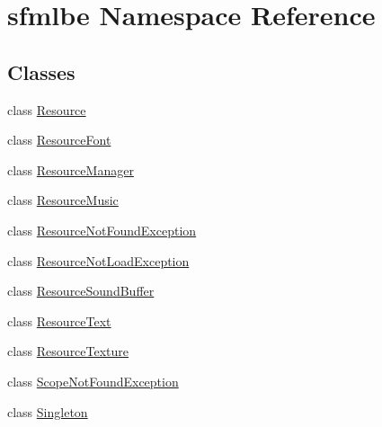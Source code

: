 \hypertarget{namespacesfmlbe}{}\section{sfmlbe Namespace Reference}
\label{namespacesfmlbe}
\subsection*{Classes}
\begin{DoxyCompactItemize}
\item 
class \mbox{\hyperlink{classsfmlbe_1_1_resource}{Resource}}
\item 
class \mbox{\hyperlink{classsfmlbe_1_1_resource_font}{Resource\+Font}}
\item 
class \mbox{\hyperlink{classsfmlbe_1_1_resource_manager}{Resource\+Manager}}
\item 
class \mbox{\hyperlink{classsfmlbe_1_1_resource_music}{Resource\+Music}}
\item 
class \mbox{\hyperlink{classsfmlbe_1_1_resource_not_found_exception}{Resource\+Not\+Found\+Exception}}
\item 
class \mbox{\hyperlink{classsfmlbe_1_1_resource_not_load_exception}{Resource\+Not\+Load\+Exception}}
\item 
class \mbox{\hyperlink{classsfmlbe_1_1_resource_sound_buffer}{Resource\+Sound\+Buffer}}
\item 
class \mbox{\hyperlink{classsfmlbe_1_1_resource_text}{Resource\+Text}}
\item 
class \mbox{\hyperlink{classsfmlbe_1_1_resource_texture}{Resource\+Texture}}
\item 
class \mbox{\hyperlink{classsfmlbe_1_1_scope_not_found_exception}{Scope\+Not\+Found\+Exception}}
\item 
class \mbox{\hyperlink{classsfmlbe_1_1_singleton}{Singleton}}
\end{DoxyCompactItemize}
